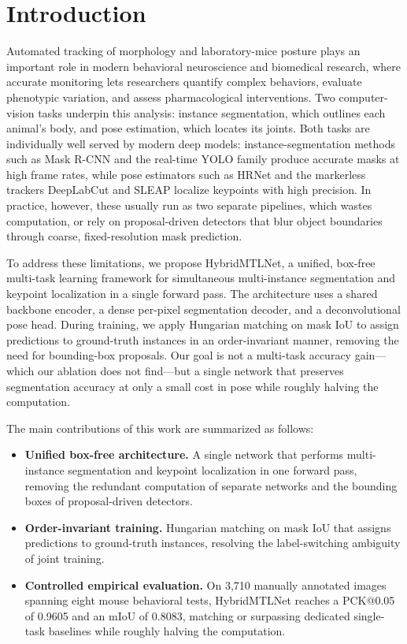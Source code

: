 \documentclass[runningheads]{llncs}
\begin{document}
\section{Introduction}

Automated tracking of morphology and laboratory-mice posture plays an
important role in modern behavioral neuroscience and biomedical
research, where accurate monitoring lets researchers quantify complex
behaviors, evaluate phenotypic variation, and assess pharmacological
interventions. Two computer-vision tasks underpin this analysis:
instance segmentation, which outlines each animal's body, and pose
estimation, which locates its joints. Both tasks are individually well
served by modern deep models: instance-segmentation methods such as
Mask R-CNN \cite{he2017maskrcnn} and the real-time YOLO family
\cite{jocher2026yolo26} produce accurate masks at high frame rates,
while pose estimators such as HRNet \cite{sun2019hrnet} and the
markerless trackers DeepLabCut \cite{mathis2018deeplabcut} and SLEAP
\cite{pereira2022sleap} localize keypoints with high precision. In practice, however, these
usually run as two separate pipelines, which wastes computation, or
rely on proposal-driven detectors that blur object boundaries through
coarse, fixed-resolution mask prediction.

To address these limitations, we propose HybridMTLNet, a unified,
box-free multi-task learning framework for simultaneous multi-instance
segmentation and keypoint localization in a single forward pass. The
architecture uses a shared backbone encoder, a dense per-pixel
segmentation decoder, and a deconvolutional pose head. During training,
we apply Hungarian matching on mask IoU to assign predictions to
ground-truth instances in an order-invariant manner, removing the need
for bounding-box proposals. Our goal is not a multi-task accuracy
gain---which our ablation does not find---but a single network that
preserves segmentation accuracy at only a small cost in pose while
roughly halving the computation.

The main contributions of this work are summarized as follows:
\begin{itemize}
  \item \textbf{Unified box-free architecture.} A single network that
        performs multi-instance segmentation and keypoint localization
        in one forward pass, removing the redundant computation of
        separate networks and the bounding boxes of proposal-driven
        detectors.
  \item \textbf{Order-invariant training.} Hungarian matching on mask
        IoU that assigns predictions to ground-truth instances,
        resolving the label-switching ambiguity of joint training.
  \item \textbf{Controlled empirical evaluation.} On 3{,}710 manually
        annotated images spanning eight mouse behavioral tests,
        HybridMTLNet reaches a PCK@0.05 of 0.9605 and an mIoU of 0.8083,
        matching or surpassing dedicated single-task baselines while
        roughly halving the computation.
\end{itemize}
\end{document}
